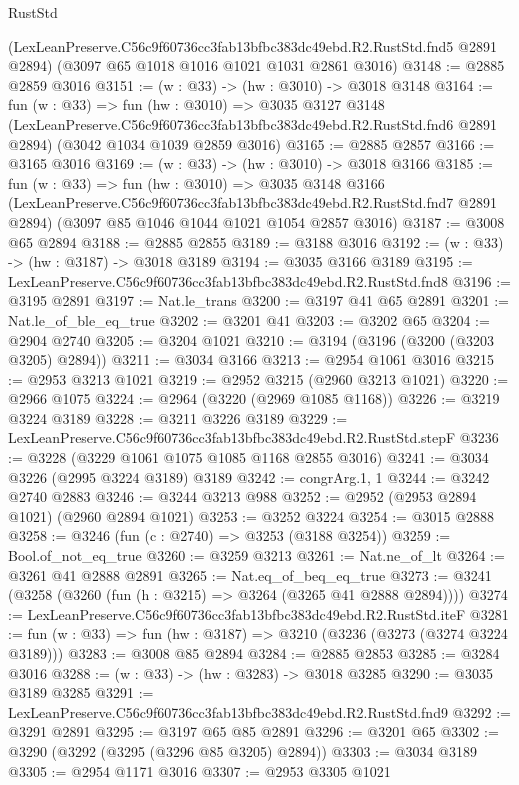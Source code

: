 \begin{lexlean}{RustStd}
\begin{coremodule}
    (LexLeanPreserve.C56c9f60736cc3fab13bfbc383dc49ebd.R2.RustStd.fnd5 @2891 @2894)
    (@3097 @65 @1018 @1016 @1021 @1031 @2861 @3016)
@3148 := @2885 @2859 @3016
@3151 := (w : @33) -> (hw : @3010) -> @3018 @3148
@3164 := fun (w : @33) =>
  fun (hw : @3010) =>
  @3035
    @3127
    @3148
    (LexLeanPreserve.C56c9f60736cc3fab13bfbc383dc49ebd.R2.RustStd.fnd6 @2891 @2894)
    (@3042 @1034 @1039 @2859 @3016)
@3165 := @2885 @2857
@3166 := @3165 @3016
@3169 := (w : @33) -> (hw : @3010) -> @3018 @3166
@3185 := fun (w : @33) =>
  fun (hw : @3010) =>
  @3035
    @3148
    @3166
    (LexLeanPreserve.C56c9f60736cc3fab13bfbc383dc49ebd.R2.RustStd.fnd7 @2891 @2894)
    (@3097 @85 @1046 @1044 @1021 @1054 @2857 @3016)
@3187 := @3008 @65 @2894
@3188 := @2885 @2855
@3189 := @3188 @3016
@3192 := (w : @33) -> (hw : @3187) -> @3018 @3189
@3194 := @3035 @3166 @3189
@3195 := LexLeanPreserve.C56c9f60736cc3fab13bfbc383dc49ebd.R2.RustStd.fnd8
@3196 := @3195 @2891
@3197 := Nat.le_trans
@3200 := @3197 @41 @65 @2891
@3201 := Nat.le_of_ble_eq_true
@3202 := @3201 @41
@3203 := @3202 @65
@3204 := @2904 @2740
@3205 := @3204 @1021
@3210 := @3194 (@3196 (@3200 (@3203 @3205) @2894))
@3211 := @3034 @3166
@3213 := @2954 @1061 @3016
@3215 := @2953 @3213 @1021
@3219 := @2952 @3215 (@2960 @3213 @1021)
@3220 := @2966 @1075
@3224 := @2964 (@3220 (@2969 @1085 @1168))
@3226 := @3219 @3224 @3189
@3228 := @3211 @3226 @3189
@3229 := LexLeanPreserve.C56c9f60736cc3fab13bfbc383dc49ebd.R2.RustStd.stepF
@3236 := @3228 (@3229 @1061 @1075 @1085 @1168 @2855 @3016)
@3241 := @3034 @3226 (@2995 @3224 @3189) @3189
@3242 := congrArg.{1, 1}
@3244 := @3242 @2740 @2883
@3246 := @3244 @3213 @988
@3252 := @2952 (@2953 @2894 @1021) (@2960 @2894 @1021)
@3253 := @3252 @3224
@3254 := @3015 @2888
@3258 := @3246 (fun (c : @2740) => @3253 (@3188 @3254))
@3259 := Bool.of_not_eq_true
@3260 := @3259 @3213
@3261 := Nat.ne_of_lt
@3264 := @3261 @41 @2888 @2891
@3265 := Nat.eq_of_beq_eq_true
@3273 := @3241 (@3258 (@3260 (fun (h : @3215) => @3264 (@3265 @41 @2888 @2894))))
@3274 := LexLeanPreserve.C56c9f60736cc3fab13bfbc383dc49ebd.R2.RustStd.iteF
@3281 := fun (w : @33) => fun (hw : @3187) => @3210 (@3236 (@3273 (@3274 @3224 @3189)))
@3283 := @3008 @85 @2894
@3284 := @2885 @2853
@3285 := @3284 @3016
@3288 := (w : @33) -> (hw : @3283) -> @3018 @3285
@3290 := @3035 @3189 @3285
@3291 := LexLeanPreserve.C56c9f60736cc3fab13bfbc383dc49ebd.R2.RustStd.fnd9
@3292 := @3291 @2891
@3295 := @3197 @65 @85 @2891
@3296 := @3201 @65
@3302 := @3290 (@3292 (@3295 (@3296 @85 @3205) @2894))
@3303 := @3034 @3189
@3305 := @2954 @1171 @3016
@3307 := @2953 @3305 @1021

\end{coremodule}
\end{lexlean}
